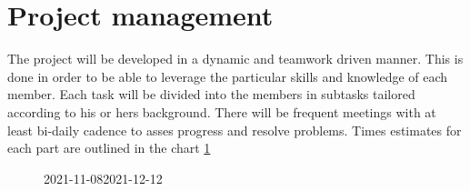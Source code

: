 \documentclass[fleqn,10pt]{SelfArx} %
\begin{document}
\section{Project management}
The project will be developed in a dynamic and teamwork driven manner.
This is done in order to be able to leverage the particular skills and knowledge of each member.
Each task will be divided into the members in subtasks tailored according to his or hers background.
There will be frequent meetings with at least bi-daily cadence to asses progress and resolve problems.
Times estimates for each part are outlined in the chart \ref{chart:gantt}

\begin{figure}[ht]
	\label{chart:gantt}

	\begin{ganttchart}[hgrid,
		vgrid,
		title label font = \tiny,
		inline,
		time slot format=isodate,
		x unit=2mm,
		canvas/.style= { fill = green!25, draw =green!50, thick},
		bar/.append style={fill=red!50},
		title/.style={fill=yellow!50}
		]{2021-11-08}{2021-12-12}
		 \\
	\\
	\\
	\\
	\\
	\\
	\\
	\\
	\\
\end{ganttchart}
\end{figure}
\end{document}
